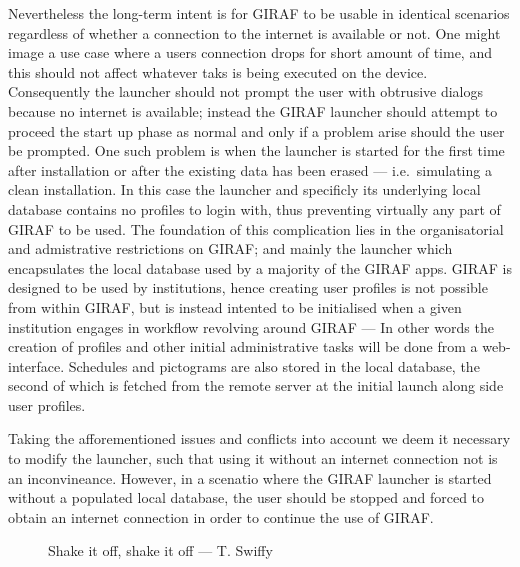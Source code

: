 Nevertheless the long-term intent is for GIRAF to be usable in identical scenarios regardless of whether a connection to the internet is available or not.
One might image a use case where a users connection drops for short amount of time, and this should not affect whatever taks is being executed on the device.
Consequently the launcher should not prompt the user with obtrusive dialogs because no internet is available; instead the GIRAF launcher should attempt to proceed the start up phase as normal and only if a problem arise should the user be prompted.
One such problem is when the launcher is started for the first time after installation or after the existing data has been erased --- i.e.\ simulating a clean installation. 
In this case the launcher and specificly its underlying local database contains no profiles to login with, thus preventing virtually any part of GIRAF to be used.
The foundation of this complication lies in the organisatorial and admistrative restrictions on GIRAF; and mainly the launcher which encapsulates the local database used by a majority of the GIRAF apps.
GIRAF is designed to be used by institutions, hence creating user profiles is not possible from within GIRAF, but is instead intented to be initialised when a given institution engages in workflow revolving around GIRAF --- In other words the creation of profiles and other initial administrative tasks will be done from a web-interface.
Schedules and pictograms are also stored in the local database, the second of which is fetched from the remote server at the initial launch along side user profiles.

\bigskip

Taking the afforementioned issues and conflicts into account we deem it necessary to modify the launcher, such that using it without an internet connection not is an inconvineance.
However, in a scenatio where the GIRAF launcher is started without a populated local database, the user should be stopped and forced to obtain an internet connection in order to continue the use of GIRAF.

\begin{figure}[h!]
\footnotesize    
{}
\caption{Shake it off, shake it off --- T. Swiffy}
\end{figure}
